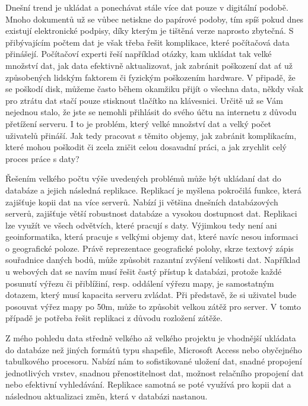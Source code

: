 Dnešní trend je ukládat a ponechávat stále více dat pouze v digitální podobě. Mnoho dokumentů už se vůbec netiskne do papírové podoby, tím spíš pokud dnes existují elektronické podpisy, díky kterým je tištěná verze naprosto zbytečná. S přibývajícím počtem dat je však třeba řešit komplikace, které počítačová data přinášejí. Počítačoví experti řeší například otázky, kam ukládat tak velké množství dat, jak data efektivně aktualizovat, jak zabránit poškození dat ať už způsobených lidským faktorem či fyzickým poškozením hardware. V připadě, že se poškodí disk, můžeme často během okamžiku přijít o všechna data, někdy však pro ztrátu dat stačí pouze stisknout tlačítko na klávesnici. Určitě už se Vám nejednou stalo, že jste se nemohli přihlásit do svého účtu na internetu z důvodu přetížení serveru. I to je problém, který velké množství dat a velký počet uživatelů přináší. Jak tedy pracovat s těmito objemy, jak zabránit komplikacím, které mohou poškodit či zcela zničit celou dosavadní práci, a jak zrychlit celý proces práce s daty? 

Řešením velkého počtu výše uvedených problémů může být ukládaní dat do databáze a jejich následná replikace. Replikací je myšlena pokročilá funkce, která zajišťuje kopii dat na více serverů. Nabízí ji většina dnešních databázových serverů, zajišťuje větší robustnost databáze a vysokou dostupnost dat. Replikaci lze využít ve všech odvětvích, které pracují s daty. Výjimkou tedy není ani geoinformatika, která pracuje s velkými objemy dat, které navíc nesou informaci o geografické poloze. Právě reprezentace geografické polohy, skrze textový zápis souřadnice daných bodů, může způsobit razantní zvýšení velikosti dat. Například u webových dat se navím musí řešit častý přístup k databázi, protože každé posunutí výřezu či přiblížiní, resp. oddálení výřezu mapy, je samostatným dotazem, který musí kapacita serveru zvládat. Při představě, že si uživatel bude posouvat výřez mapy po 50m, může to způsobit velkou zátěž pro server. V tomto případě je potřeba řešit replikaci z důvodu rozložení zátěže. 

Z mého pohledu data středně velkého až velkého projektu je vhodnější ukládata do databáze než jiných formátů typu shapefile, Microsoft Access nebo obyčejného tabulkového procesoru. Nabízí nám to sofistikované uložení dat, snadné propojení jednotlivých vrstev, snadnou přenostitelnost dat, možnost relačního propojení dat nebo efektivní vyhledávání. Replikace samotná se poté využívá pro kopii dat a následnou aktualizaci změn, která v databázi nastanou. 

